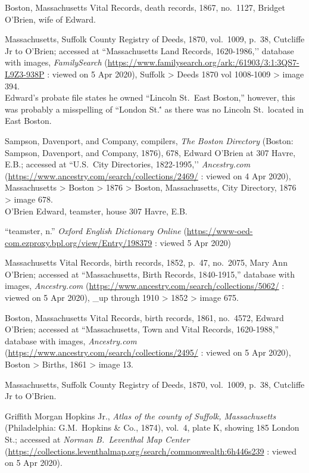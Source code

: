 \begin{thebibliography}{999}
Boston, Massachusetts Vital Records, death records, 1867, no.\ 1127, Bridget O'Brien, wife of Edward.

Massachusetts, Suffolk County Registry of Deeds, 1870, vol.\ 1009, p.\ 38, Cutcliffe Jr to O’Brien; accessed at ``Massachusetts Land Records, 1620-1986,’’ database with images, \textit{FamilySearch} (\url{https://www.familysearch.org/ark:/61903/3:1:3QS7-L9Z3-938P} : viewed on 5 Apr 2020), Suffolk > Deeds 1870 vol 1008-1009 > image 394.\\
Edward's probate file states he owned ``Lincoln St.\  East Boston,'' however, this was probably a misspelling of ``London St.\'' as there was no Lincoln St.\ located in East Boston.\cite{EastBostonStreets}

Sampson, Davenport, and Company, compilers, \textit{The Boston Directory} (Boston: Sampson, Davenport, and Company, 1876), 678, Edward O’Brien at 307 Havre, E.B.; accessed at ``U.S.\ City Directories, 1822-1995,’’ \textit{Ancestry.com} (\url{https://www.ancestry.com/search/collections/2469/} : viewed on 4 Apr 2020), Massachusetts > Boston > 1876 > Boston, Massachusetts, City Directory, 1876 > image 678.\\
O’Brien Edward, teamster, house 307 Havre, E.B.

``teamster, n.'' \textit{Oxford English Dictionary Online} (\url{https://www-oed-com.ezproxy.bpl.org/view/Entry/198379} : viewed 5 Apr 2020)

Massachusetts Vital Records, birth records, 1852, p.\ 47, no.\ 2075, Mary Ann O'Brien; accessed at ``Massachusetts, Birth Records, 1840-1915,'' database with images, \textit{Ancestry.com} (\url{https://www.ancestry.com/search/collections/5062/} : viewed on 5 Apr 2020), \_up through 1910 > 1852 > image 675.

Boston, Massachusetts Vital Records, birth records, 1861, no.\ 4572, Edward O'Brien; accessed at ``Massachusetts, Town and Vital Records, 1620-1988,'' database with images, \textit{Ancestry.com} (\url{https://www.ancestry.com/search/collections/2495/} : viewed on 5 Apr 2020), Boston > Births, 1861 > image 13.

Massachusetts, Suffolk County Registry of Deeds, 1870, vol.\ 1009, p.\ 38, Cutcliffe Jr to O’Brien.

Griffith Morgan Hopkins Jr., \textit{Atlas of the county of Suffolk, Massachusetts} (Philadelphia: G.M.\ Hopkins \& Co., 1874), vol.\ 4, plate K, showing 185 London St.; accessed at \textit{Norman B.\ Leventhal Map Center} (\url{https://collections.leventhalmap.org/search/commonwealth:6h446s239} : viewed on 5 Apr 2020).


\end{thebibliography}
